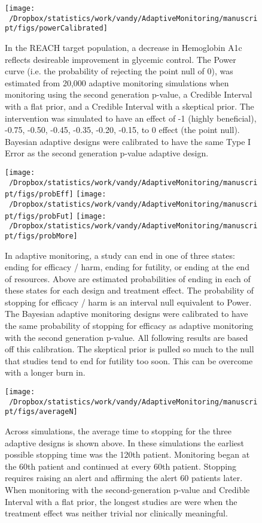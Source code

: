 \documentclass[12pt,oneside]{book}
\newlength{\li}\setlength{\li}{14.48pt}
\newlength{\di}\setlength{\di}{-3.5mm}
\theoremstyle{definition}
\theoremstyle{definition}
\theoremstyle{definition}
\theoremstyle{remark}
\begin{document}
\begin{figure}[H]

{\centering \texttt{[image: ~/Dropbox/statistics/work/vandy/AdaptiveMonitoring/manuscript/figs/powerCalibrated]} 

}

\caption{In the REACH target population, a decrease in Hemoglobin A1c reflects desireable improvement in glycemic control.  The Power curve (i.e. the probability of rejecting the point null of 0), was estimated from 20,000 adaptive monitoring simulations when monitoring using the second generation p-value, a Credible Interval with a flat prior, and a Credible Interval with a skeptical prior.  The intervention was simulated to have an effect of -1 (highly beneficial), -0.75, -0.50, -0.45, -0.35, -0.20, -0.15, to 0 effect (the point null).  Bayesian adaptive designs were calibrated to have the same Type I Error as the second generation p-value adaptive design.}\label{fig:Power}
\end{figure}

\begin{figure}[H]

{\centering \texttt{[image: ~/Dropbox/statistics/work/vandy/AdaptiveMonitoring/manuscript/figs/probEff]} \texttt{[image: ~/Dropbox/statistics/work/vandy/AdaptiveMonitoring/manuscript/figs/probFut]} \texttt{[image: ~/Dropbox/statistics/work/vandy/AdaptiveMonitoring/manuscript/figs/probMore]} 

}

\caption{In adaptive monitoring, a study can end in one of three states: ending for efficacy / harm, ending for futility, or ending at the end of resources.  Above are estimated probabilities of ending in each of these states for each design and treatment effect.  The probability of stopping for efficacy / harm is an interval null equivalent to Power.  The Bayesian adaptive monitoring designs were calibrated to have the same probability of stopping for efficacy as adaptive monitoring with the second generation p-value.  All following results are based off this calibration.  The skeptical prior is pulled so much to the null that studies tend to end for futility too soon.  This can be overcome with a longer burn in.}\label{fig:state}
\end{figure}

\begin{figure}[H]

{\centering \texttt{[image: ~/Dropbox/statistics/work/vandy/AdaptiveMonitoring/manuscript/figs/averageN]} 

}

\caption{Across  simulations, the average time to stopping for the three adaptive designs is shown above.  In these simulations the earliest possible stopping time was the 120th patient.  Monitoring began at the 60th patient and continued at every 60th patient.  Stopping requires raising an alert and affirming the alert 60 patients later.  When monitoring with the second-generation p-value and Credible Interval with a flat prior, the longest studies are were when the treatment effect was neither trivial nor clinically meaningful.}\label{fig:sampleSize}
\end{figure}
\end{document}
